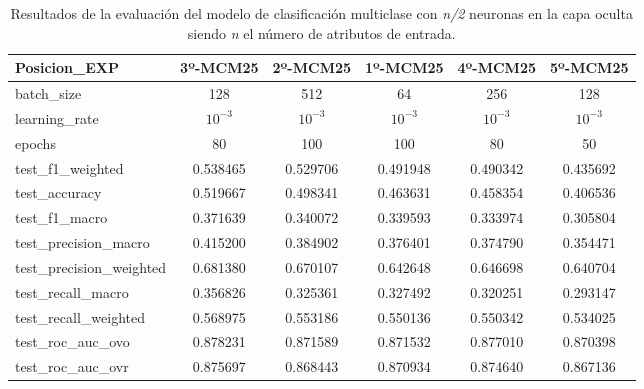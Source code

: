 \begin{table}[H]
\begin{tabular}{|>{\columncolor[HTML]{E0FFFF}}l|c|c|c|c|c|}
\hline
Posicion\_EXP & 3º-MCM25 & 2º-MCM25 & 1º-MCM25 & 4º-MCM25 & 5º-MCM25 \\
\hline
\cellcolor[HTML]{E0FFFF}batch\_size & \cellcolor[HTML]{66ffa8}128 & \cellcolor[HTML]{66ffa8}512 & \cellcolor[HTML]{66ffa8}64 & \cellcolor[HTML]{66ffa8}256 & \cellcolor[HTML]{66ffa8}128 \\
\cellcolor[HTML]{E0FFFF}learning\_rate & \cellcolor[HTML]{f99595}$10^{-3}$ & \cellcolor[HTML]{f99595}$10^{-3}$ & \cellcolor[HTML]{f99595}$10^{-3}$ & \cellcolor[HTML]{f99595}$10^{-3}$ & \cellcolor[HTML]{f99595}$10^{-3}$ \\
\cellcolor[HTML]{E0FFFF}epochs & \cellcolor[HTML]{b1bafb}80 & \cellcolor[HTML]{b1bafb}100 & \cellcolor[HTML]{b1bafb}100 & \cellcolor[HTML]{b1bafb}80 & \cellcolor[HTML]{b1bafb}50 \\
\cellcolor[HTML]{E0FFFF}test\_f1\_weighted & 0.538465 & 0.529706 & 0.491948 & 0.490342 & 0.435692 \\
\cellcolor[HTML]{E0FFFF}test\_accuracy & 0.519667 & 0.498341 & 0.463631 & 0.458354 & 0.406536 \\
\cellcolor[HTML]{E0FFFF}test\_f1\_macro & 0.371639 & 0.340072 & 0.339593 & 0.333974 & 0.305804 \\
\cellcolor[HTML]{E0FFFF}test\_precision\_macro & 0.415200 & 0.384902 & 0.376401 & 0.374790 & 0.354471 \\
\cellcolor[HTML]{E0FFFF}test\_precision\_weighted & 0.681380 & 0.670107 & 0.642648 & 0.646698 & 0.640704 \\
\cellcolor[HTML]{E0FFFF}test\_recall\_macro & 0.356826 & 0.325361 & 0.327492 & 0.320251 & 0.293147 \\
\cellcolor[HTML]{E0FFFF}test\_recall\_weighted & 0.568975 & 0.553186 & 0.550136 & 0.550342 & 0.534025 \\
\cellcolor[HTML]{E0FFFF}test\_roc\_auc\_ovo & 0.878231 & 0.871589 & 0.871532 & 0.877010 & 0.870398 \\
\cellcolor[HTML]{E0FFFF}test\_roc\_auc\_ovr & 0.875697 & 0.868443 & 0.870934 & 0.874640 & 0.867136 \\
\hline
\end{tabular}
    \caption{Resultados de la evaluación del modelo de clasificación multiclase con \textit{n/2} neuronas en la capa oculta siendo \textit{n} el número de atributos de entrada.}
    \label{fig:EVALMCM25}
\end{table}

